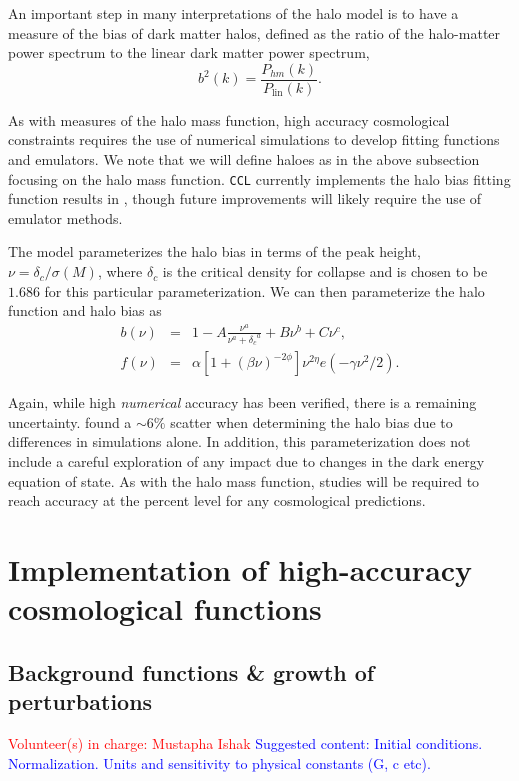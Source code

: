 \documentclass[\docopts]{\docclass}
\newcommand{\vol}[1]{\textcolor{red}{Volunteer(s) in charge: #1}}
\newcommand{\cont}[1]{\textcolor{blue}{Suggested content: #1}}
\begin{document}
An important step in many interpretations of the halo model is to have a measure of the bias of dark matter halos, defined as the ratio of the halo-matter power spectrum to the linear dark matter power spectrum,
\begin{equation}
  b^2(k) = \frac{P_{hm}(k)}{P_{\mathrm{lin}}(k)}.
\end{equation}

As with measures of the halo mass function, high accuracy cosmological constraints requires the use of numerical simulations to develop fitting functions and emulators. We note that we will define haloes as in the above subsection focusing on the halo mass function. {\tt CCL} currently implements the halo bias fitting function results in \citet{Tinker2010}, though future improvements will likely require the use of emulator methods.

The \citet{Tinker2010} model parameterizes the halo bias in terms of the peak height, $\nu = \delta_c / \sigma(M)$, where $\delta_c$ is the critical density for collapse and is chosen to be $1.686$ for this particular parameterization. We can then parameterize the halo function and halo bias as
\begin{eqnarray}
  b(\nu) &=& 1 - A\frac{\nu^a}{\nu^a + {\delta_c}^a} + B\nu^b+C\nu^c,\\
  f(\nu) &=& \alpha[1+(\beta\nu)^{-2\phi}]\nu^{2\eta}e(-\gamma\nu^2/2).
\end{eqnarray}

Again, while high {\em numerical} accuracy has been verified, there is a remaining uncertainty. \citet{Tinker2010} found a $\sim6\%$ scatter when determining the halo bias due to differences in simulations alone. In addition, this parameterization does not include a careful exploration of any impact due to changes in the dark energy equation of state. As with the halo mass function, studies will be required to reach accuracy at the percent level for any cosmological predictions. 

\section{Implementation of high-accuracy cosmological functions}

\subsection{Background functions \& growth of perturbations}
\vol{Mustapha Ishak}
\label{sec:distances}
\cont{Initial conditions. Normalization. Units and sensitivity to physical constants (G, c etc).}
\end{document}
